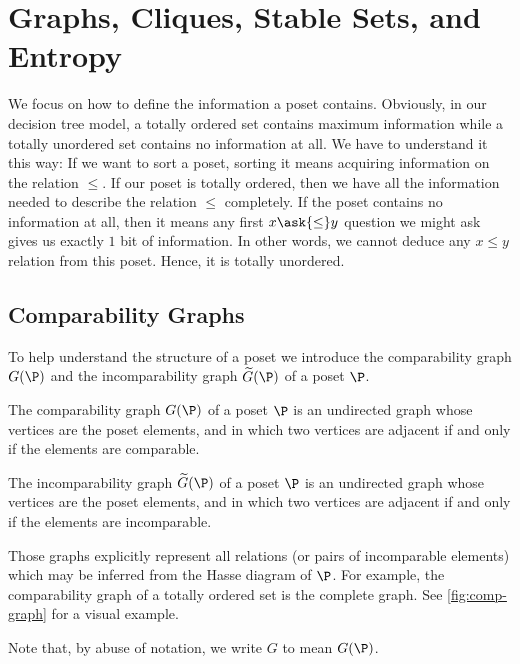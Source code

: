 \section{Graphs, Cliques, Stable Sets, and Entropy}
\label{tree:poset:graph}

We focus on how to define the information a poset contains. Obviously, in
our decision tree model, a totally ordered set contains maximum information
while a totally unordered set contains no information at all. We have to
understand it this way: If we want to sort a poset, sorting it means acquiring
information on the relation $\le$. If our poset is totally ordered, then we
have all the information needed to describe the relation $\le$ completely. If
the poset contains no information at all, then it means any first $x \ask{\le}
y$ question we might ask gives us exactly $1$ bit of information. In other
words, we cannot deduce any $x \le y$ relation from this poset. Hence, it is
totally unordered.

\subsection{Comparability Graphs}

To help understand the structure of a poset we introduce the comparability
graph ${G}(\P)$ and the incomparability graph $\widetilde{G}(\P)$ of a poset
\(\P\).
\begin{definition}
The comparability graph ${G}(\P)$ of a poset $\P$ is an undirected graph whose
vertices are the poset elements, and in which two vertices are adjacent if and
only if the elements are comparable.
\end{definition}
\begin{definition}
The incomparability graph $\widetilde{G}(\P)$ of a poset $\P$ is an undirected
graph whose vertices are the poset elements, and in which two vertices are
adjacent if and only if the elements are incomparable.
\end{definition}

Those graphs explicitly represent all relations (or pairs of incomparable
elements) which may be inferred from the Hasse diagram of $\P$. For example,
the comparability graph of a totally ordered set is the complete graph. See
\ref{fig:comp-graph} for a visual example.

Note that, by abuse of notation, we write $G$ to mean ${G}(\P)$.


